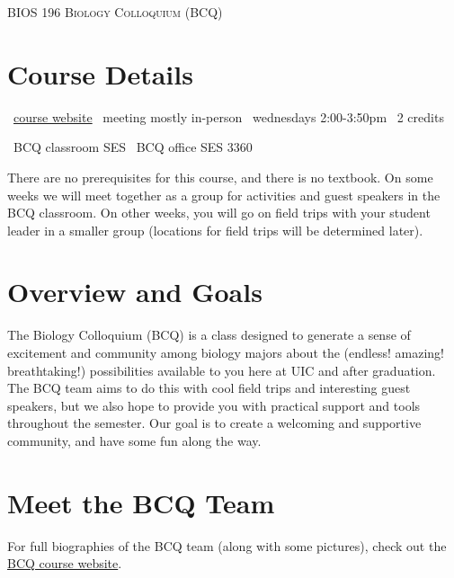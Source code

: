 \documentclass[]{article}
\begin{document}
\begin{center}
  \textsc{\large{BIOS 196 Biology Colloquium (BCQ)}}
  \end{center}


\section{Course Details}

\begin{center}

\faLaptop\ \href{www.link.com}{course website} \hspace{1.5mm} \faSchool\ meeting mostly in-person \hspace{1.5mm} \faClock\ wednesdays 2:00-3:50pm \hspace{1.5mm} \faCreditCard\  2 credits  

\faCompass\ BCQ classroom SES \hspace{1.5mm}  \faCompass\ BCQ office SES 3360
  
\end{center}


There are no prerequisites for this course, and there is no textbook. On some weeks we will meet together as a group for activities and guest speakers in the BCQ classroom. On other weeks, you will go on field trips with your student leader in a smaller group (locations for field trips will be determined later).

\section{Overview and Goals}

The Biology Colloquium (BCQ) is a class designed to generate a sense of excitement and community among biology majors about the (endless! amazing! breathtaking!) possibilities available to you here at UIC and after graduation. The BCQ team aims to do this with cool field trips and interesting guest speakers, but we also hope to provide you with practical support and tools throughout the semester. Our goal is to create a welcoming and supportive community, and have some fun along the way.

\section{Meet the BCQ Team}

For full biographies of the BCQ team (along with some pictures), check out the \href{www.link.com}{BCQ course website}.
\end{document}
